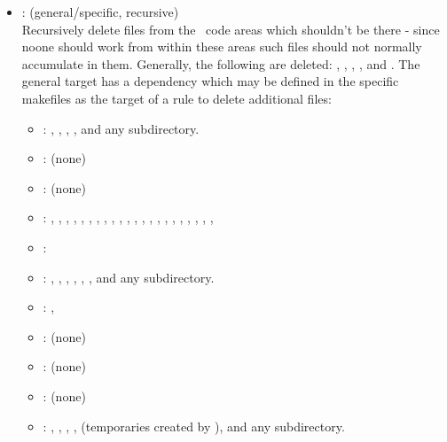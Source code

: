 \begin{itemize}
\item
    : (general/specific, recursive)
   \\ Recursively delete files from the \aipspp\ code areas which shouldn't
   be there - since noone should work from within these areas such files
   should not normally accumulate in them.  Generally, the following are
   deleted: \file{,*,}, \file{*~}, \file{*\%}, , and .
   The general target has a dependency which may be defined in the specific
   makefiles as the target of a rule to delete additional files:
   \begin{itemize}
   \item
      : , , , , and any
       subdirectory.
   \item
      : (none)
   \item
      : (none)
   \item
      : , , , ,
      , , , , ,
      , , , , ,
      , , , , ,
      , , , 
   \item
      : 
   \item
      : , , , ,
      , , and any  subdirectory.
   \item
      : , 
   \item
      : (none)
   \item
      : (none)
   \item
      : (none)
   \item
      : , , , ,
       (temporaries created by ), and any
       subdirectory.
   \end{itemize}


\end{itemize}

